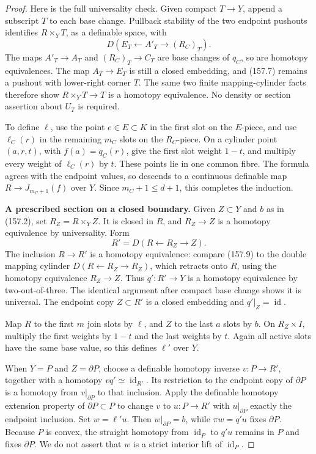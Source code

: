 \begin{proof}
Here is the full universality check. Given compact \(T\to Y\), append a subscript \(T\) to each base change. Pullback stability of the two endpoint pushouts identifies \(R\times_YT\), as a definable space, with
\[
 D(E_T\leftarrow A'_T\to (R_C)_T).
\]
The maps \(A'_T\to A_T\) and \((R_C)_T\to C_T\) are base changes of \(q_C\), so are homotopy equivalences. The map \(A_T\to E_T\) is still a closed embedding, and (157.7) remains a pushout with lower-right corner \(T\). The same two finite mapping-cylinder facts therefore show \(R\times_YT\to T\) is a homotopy equivalence. No density or section assertion about \(U_T\) is required.

To define \(\ell\), use the point \(e\in E\subset K\) in the first slot on the \(E\)-piece, and use \(\ell_C(r)\) in the remaining \(m_C\) slots on the \(R_C\)-piece. On a cylinder point \((a,r,t)\), with \(f(a)=q_C(r)\), give the first slot weight \(1-t\), and multiply every weight of \(\ell_C(r)\) by \(t\). These points lie in one common fibre. The formula agrees with the endpoint values, so descends to a continuous definable map \(R\to J_{m_C+1}(f)\) over \(Y\). Since \(m_C+1\le d+1\), this completes the induction.

\textbf{A prescribed section on a closed boundary.}
Given \(Z\subset Y\) and \(b\) as in (157.2), set \(R_Z=R\times_YZ\). It is closed in \(R\), and \(R_Z\to Z\) is a homotopy equivalence by universality. Form
\[
 R'=D(R\leftarrow R_Z\to Z).
 \tag{157.9}
\]
The inclusion \(R\to R'\) is a homotopy equivalence: compare (157.9) to the double mapping cylinder \(D(R\leftarrow R_Z\to R_Z)\), which retracts onto \(R\), using the homotopy equivalence \(R_Z\to Z\). Thus \(q':R'\to Y\) is a homotopy equivalence by two-out-of-three. The identical argument after compact base change shows it is universal. The endpoint copy \(Z\subset R'\) is a closed embedding and \(q'|_Z=\operatorname{id}\).

Map \(R\) to the first \(m\) join slots by \(\ell\), and \(Z\) to the last \(a\) slots by \(b\). On \(R_Z\times I\), multiply the first weights by \(1-t\) and the last weights by \(t\). Again all active slots have the same base value, so this defines \(\ell'\) over \(Y\).

When \(Y=P\) and \(Z=\partial P\), choose a definable homotopy inverse \(v:P\to R'\), together with a homotopy \(v q'\simeq\operatorname{id}_{R'}\). Its restriction to the endpoint copy of \(\partial P\) is a homotopy from \(v|_{\partial P}\) to that inclusion. Apply the definable homotopy extension property of \(\partial P\subset P\) to change \(v\) to \(u:P\to R'\) with \(u|_{\partial P}\) exactly the endpoint inclusion. Set \(w=\ell'u\). Then \(w|_{\partial P}=b\), while \(\pi w=q'u\) fixes \(\partial P\). Because \(P\) is convex, the straight homotopy from \(\operatorname{id}_P\) to \(q'u\) remains in \(P\) and fixes \(\partial P\). We do not assert that \(w\) is a strict interior lift of \(\operatorname{id}_P\).


\end{proof}
